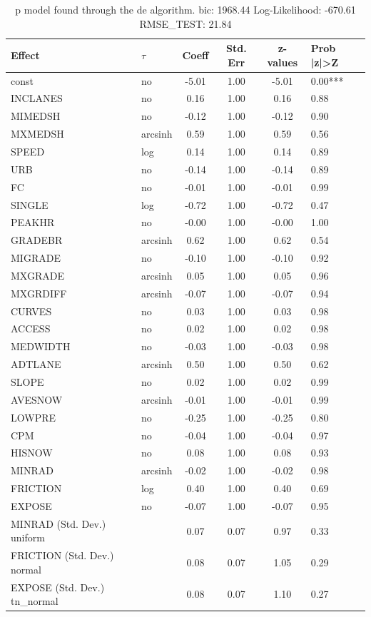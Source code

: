 \begin{table}
	\caption{p model found through the de algorithm. bic: 1968.44 Log-Likelihood: -670.61 RMSE_TEST: 21.84}
	\begin{center}
		\begin{tabular}{|l|l|c|c|c|l|}
			\hline
			Effect & $\tau$ & Coeff & Std. Err & z-values & Prob |z|>Z \\
			\hline
			const & no & -5.01 & 1.00 & -5.01 & 0.00*** \\
			\hline
			INCLANES & no & 0.16 & 1.00 & 0.16 & 0.88 \\
			\hline
			MIMEDSH & no & -0.12 & 1.00 & -0.12 & 0.90 \\
			\hline
			MXMEDSH & arcsinh & 0.59 & 1.00 & 0.59 & 0.56 \\
			\hline
			SPEED & log & 0.14 & 1.00 & 0.14 & 0.89 \\
			\hline
			URB & no & -0.14 & 1.00 & -0.14 & 0.89 \\
			\hline
			FC & no & -0.01 & 1.00 & -0.01 & 0.99 \\
			\hline
			SINGLE & log & -0.72 & 1.00 & -0.72 & 0.47 \\
			\hline
			PEAKHR & no & -0.00 & 1.00 & -0.00 & 1.00 \\
			\hline
			GRADEBR & arcsinh & 0.62 & 1.00 & 0.62 & 0.54 \\
			\hline
			MIGRADE & no & -0.10 & 1.00 & -0.10 & 0.92 \\
			\hline
			MXGRADE & arcsinh & 0.05 & 1.00 & 0.05 & 0.96 \\
			\hline
			MXGRDIFF & arcsinh & -0.07 & 1.00 & -0.07 & 0.94 \\
			\hline
			CURVES & no & 0.03 & 1.00 & 0.03 & 0.98 \\
			\hline
			ACCESS & no & 0.02 & 1.00 & 0.02 & 0.98 \\
			\hline
			MEDWIDTH & no & -0.03 & 1.00 & -0.03 & 0.98 \\
			\hline
			ADTLANE & arcsinh & 0.50 & 1.00 & 0.50 & 0.62 \\
			\hline
			SLOPE & no & 0.02 & 1.00 & 0.02 & 0.99 \\
			\hline
			AVESNOW & arcsinh & -0.01 & 1.00 & -0.01 & 0.99 \\
			\hline
			LOWPRE & no & -0.25 & 1.00 & -0.25 & 0.80 \\
			\hline
			CPM & no & -0.04 & 1.00 & -0.04 & 0.97 \\
			\hline
			HISNOW & no & 0.08 & 1.00 & 0.08 & 0.93 \\
			\hline
			MINRAD & arcsinh & -0.02 & 1.00 & -0.02 & 0.98 \\
			\hline
			FRICTION & log & 0.40 & 1.00 & 0.40 & 0.69 \\
			\hline
			EXPOSE & no & -0.07 & 1.00 & -0.07 & 0.95 \\
			\hline
			MINRAD (Std. Dev.) uniform &  & 0.07 & 0.07 & 0.97 & 0.33 \\
			\hline
			FRICTION (Std. Dev.) normal &  & 0.08 & 0.07 & 1.05 & 0.29 \\
			\hline
			EXPOSE (Std. Dev.) tn_normal &  & 0.08 & 0.07 & 1.10 & 0.27 \\
			\hline
		\end{tabular}
	\end{center}
\end{table}